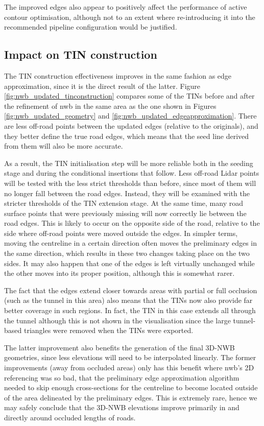 The improved edges also appear to positively affect the performance of active contour optimisation, although not to an extent where re-introducing it into the recommended pipeline configuration would be justified.

\subsection{Impact on TIN construction}
\label{sub:nwb_updated_tinconstruction}

The TIN construction effectiveness improves in the same fashion as edge approximation, since it is the direct result of the latter. Figure \ref{fig:nwb_updated_tinconstruction} compares some of the TINs before and after the refinement of \ac{nwb} in the same area as the one shown in Figures \ref{fig:nwb_updated_geometry} and \ref{fig:nwb_updated_edgeapproximation}. There are less off-road points between the updated edges (relative to the originals), and they better define the true road edges, which means that the seed line derived from them will also be more accurate.

As a result, the TIN initialisation step will be more reliable both in the seeding stage and during the conditional insertions that follow. Less off-road Lidar points will be tested with the less strict thresholds than before, since most of them will no longer fall between the road edges. Instead, they will be examined with the stricter thresholds of the TIN extension stage. At the same time, many road surface points that were previously missing will now correctly lie between the road edges. This is likely to occur on the opposite side of the road, relative to the side where off-road points were moved outside the edges. In simpler terms, moving the centreline in a certain direction often moves the preliminary edges in the same direction, which results in these two changes taking place on the two sides. It may also happen that one of the edges is left virtually unchanged while the other moves into its proper position, although this is somewhat rarer.

The fact that the edges extend closer towards areas with partial or full occlusion (such as the tunnel in this area) also means that the TINs now also provide far better coverage in such regions. In fact, the TIN in this case extends all through the tunnel although this is not shown in the visualisation since the large tunnel-based triangles were removed when the TINs were exported.

The latter improvement also benefits the generation of the final 3D-NWB geometries, since less elevations will need to be interpolated linearly. The former improvements (away from occluded areas) only has this benefit where \ac{nwb}'s 2D referencing was so bad, that the preliminary edge approximation algorithm needed to skip enough cross-sections for the centreline to become located outside of the area delineated by the preliminary edges. This is extremely rare, hence we may safely conclude that the 3D-NWB elevations improve primarily in and directly around occluded lengths of roads.

